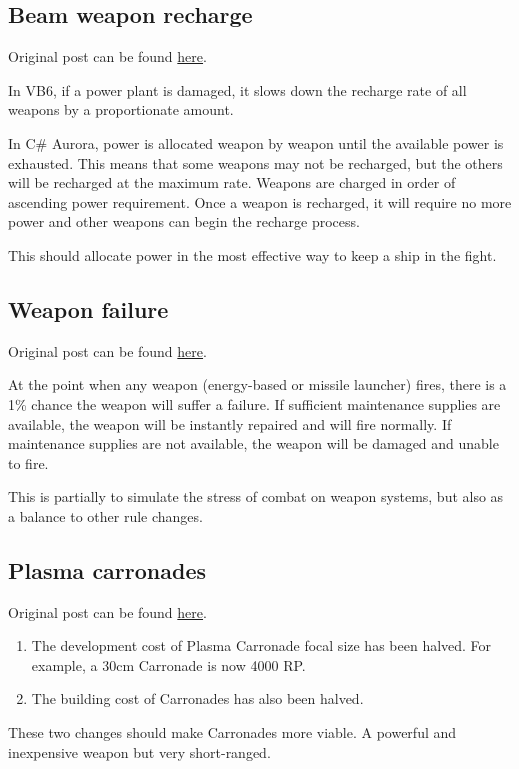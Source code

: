 \documentclass[../Aurora C# unofficial manual.tex]{subfiles}
\begin{document}
	
	\subsection{Beam weapon recharge}
	Original post can be found
	\href{http://aurora2.pentarch.org/index.php?topic=8495.msg103586#msg103586}{here}.
	\newline\newline
	
	In VB6, if a power plant is damaged, it slows down the recharge rate of all weapons by a proportionate amount.
	
	In C\# Aurora, power is allocated weapon by weapon until the available power is exhausted. This means that some weapons may not be recharged, but the others will be recharged at the maximum rate. Weapons are charged in order of ascending power requirement. Once a weapon is recharged, it will require no more power and other weapons can begin the recharge process.
	
	This should allocate power in the most effective way to keep a ship in the fight.
	
	
	\subsection{Weapon failure}
	Original post can be found
	\href{http://aurora2.pentarch.org/index.php?topic=8495.msg107701#msg107701}{here}.
	\newline\newline
	
	
	At the point when any weapon (energy-based or missile launcher) fires, there is a 1\% chance the weapon will suffer a failure. If sufficient maintenance supplies are available, the weapon will be instantly repaired and will fire normally. If maintenance supplies are not available, the weapon will be damaged and unable to fire.
	
	This is partially to simulate the stress of combat on weapon systems, but also as a balance to other rule changes.
	
	
	\subsection{Plasma carronades}
	Original post can be found
	\href{http://aurora2.pentarch.org/index.php?topic=8495.msg102669#msg102669}{here}.
	\newline\newline
	
	
	\begin{enumerate}
		\item The development cost of Plasma Carronade focal size has been halved. For example, a 30cm Carronade is now 4000 RP.
		\item The building cost of Carronades has also been halved.
	\end{enumerate}
	These two changes should make Carronades more viable. A powerful and inexpensive weapon but very short-ranged.
	
\end{document}
